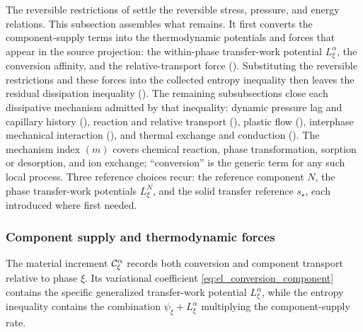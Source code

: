 The reversible restrictions of  settle the
reversible stress, pressure, and energy relations.  This subsection assembles
what remains.  It first converts the component-supply terms into the
thermodynamic potentials and forces that appear in the source projection: the
within-phase transfer-work potential \(L_\xi^\alpha\), the conversion
affinity, and the relative-transport force
().  Substituting the reversible restrictions
and these forces into the collected entropy inequality then leaves the residual
dissipation inequality ().  The remaining
subsubsections close each dissipative mechanism admitted by that inequality:
dynamic pressure lag and capillary history
(), reaction and relative transport
(), plastic flow
(), interphase mechanical interaction
(), and thermal exchange and
conduction ().  The mechanism index
\((m)\) covers chemical reaction, phase transformation, sorption or
desorption, and ion exchange; ``conversion'' is the generic term for any such
local process.  Three reference choices recur: the reference component \(N\),
the phase transfer-work potentials \(L_\xi^N\), and the solid transfer
reference \(s_\star\), each introduced where first needed.

\subsubsection{Component supply and thermodynamic forces}
\label{sec:MC_component_supply_forces}

The material increment \(\mathcal{C}_\xi^\alpha\) records both conversion and
component transport relative to phase \(\xi\).  Its variational coefficient
\eqref{eq:el_conversion_component} contains the specific generalized
transfer-work potential
\(L_\xi^\alpha\), while the entropy inequality contains the combination
\(\psi_\xi+L_\xi^\alpha\) multiplying the component-supply rate.

